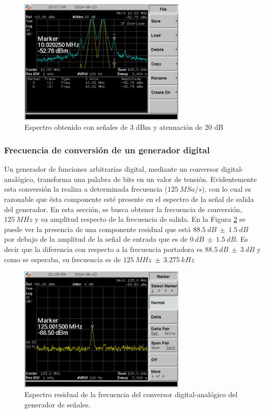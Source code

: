 \documentclass[a4paper,10pt]{article}
\begin{document}
		\begin{figure}[!htb]
				\centering
				\includegraphics[width=8cm]
				{Imagenes/SCREN447.png}
				\caption{Espectro obtenido con se\~nales de 3 dBm y atenuaci\'on de 20 dB}
				\label{intermod2} 
		\end{figure}
				
		\subsubsection{Frecuencia de conversi\'on de un generador digital}
		\indent Un generador de funciones arbitrarias digital, mediante un 
		conversor digital-anal\'ogico, transforma una palabra de bits en un 
		valor de tensi\'on. Evidentemente esta conversi\'on la realiza a 
		determinada frecuencia ($125~MSa/s$), con lo cual es razonable que 
		\'esta componente est\'e presente en el espectro de la se\~nal de salida
		del generador. En esta secci\'on, se busca obtener la frecuencia de 
		conversi\'on, $125~MHz$ y su amplitud respecto de la frecuencia de 
		salida. En la Figura \ref{freqres} se puede ver la presencia de una 
		componente residual que est\'a $88.5~dB~\pm~1.5~dB$ por debajo de la 
		amplitud de la se\~nal de entrada que es de $0~dB~\pm~1.5~dB$. Es decir 
		que la diferencia con respecto a la frecuencia portadora es 
		$88.5~dB~\pm~3~dB$ y como se esperaba, su frecuencia es de 
		$125~MHz~\pm~3.275~kHz$
		
		\begin{figure}[!htb]
				\centering
				\includegraphics[width=8cm]
				{Imagenes/SCREN448.png}
				\caption{Espectro residual de la frecuencia del conversor 
				digital-anal\'ogico del generador de se\~nales.}
				\label{freqres} 
		\end{figure}
		
\end{document}
